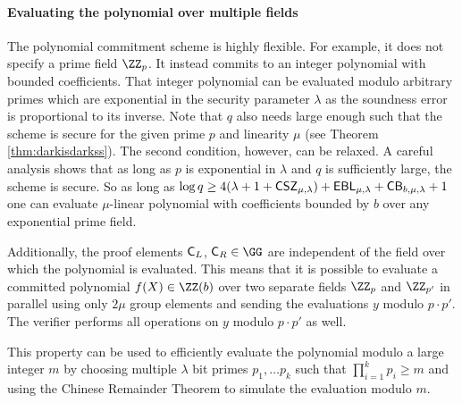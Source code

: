\paragraph{Evaluating the polynomial over multiple fields}
The polynomial commitment scheme is highly flexible. For example, it does not specify a prime field $\ZZ_p$. It instead commits to an integer polynomial with bounded coefficients. That integer polynomial can be evaluated modulo arbitrary primes which are exponential in the security parameter $\lambda$ as the soundness error is proportional to its inverse.
Note that $q$ also needs large enough such that the scheme is secure for the given prime $p$ and linearity $\mu$ (see Theorem \ref{thm:darkisdarkss}). The second condition, however, can be relaxed. A careful analysis shows that as long as $p$ is exponential in $\lambda$ and $q$ is sufficiently large, the scheme is secure. So as long as $\log q \geq 4(\lambda + 1 + \CSZ[\mu] ) + \EBL[\mu] + \mathsf{CB}_{b,\mu,\lambda} + 1$ one can evaluate $\mu$-linear polynomial with coefficients bounded by $b$ over any exponential prime field.

Additionally, the proof elements $\gr{C}_L$, $\gr{C}_R \in \GG$ are independent of the field over which the polynomial is evaluated. This means that it is possible to evaluate a committed polynomial $f(X) \in \ZZ(b)$ over two separate fields $\ZZ_{p}$ and $\ZZ_{p'}$ in parallel using only $2\mu$ group elements and sending the evaluations $y$ modulo $p\cdot p'$. The verifier performs all operations on $y$ modulo $p\cdot p'$ as well.

This property can be used to efficiently evaluate the polynomial modulo a large integer $m$ by choosing multiple $\lambda$ bit primes $p_1,\dots p_k$ such that $\prod_{i=1}^k p_i\geq m$ and using the Chinese Remainder Theorem to simulate the evaluation modulo $m$.


